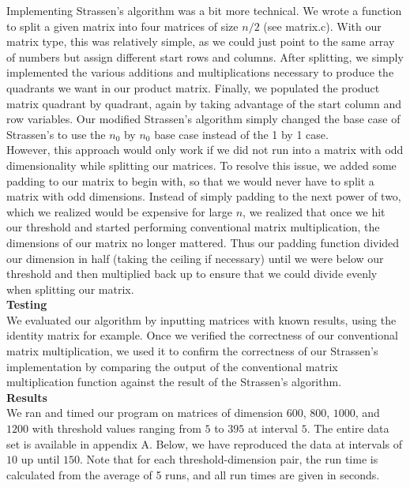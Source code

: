 \documentclass[12pt]{article}
\begin{document}
Implementing Strassen's algorithm was a bit more technical. We wrote a function to split a given matrix into four matrices of size $n/2$ (see matrix.c). With our matrix type, this was relatively simple, as we could just point to the same array of numbers but assign different start rows and columns. After splitting, we simply implemented the various additions and multiplications necessary to produce the quadrants we want in our product matrix. Finally, we populated the product matrix quadrant by quadrant, again by taking advantage of the start column and row variables. Our modified Strassen's algorithm simply changed the base case of Strassen's to use the $n_0$ by $n_0$ base case instead of the 1 by 1 case. \\

However, this approach would only work if we did not run into a matrix with odd dimensionality while splitting our matrices. To resolve this issue, we added some padding to our matrix to begin with, so that we would never have to split a matrix with odd dimensions. Instead of simply padding to the next power of two, which we realized would be expensive for large $n$, we realized that once we hit our threshold and started performing conventional matrix multiplication, the dimensions of our matrix no longer mattered. Thus our padding function divided our dimension in half (taking the ceiling if necessary) until we were below our threshold and then multiplied back up to ensure that we could divide evenly when splitting our matrix. \\

\textbf{Testing} \\
We evaluated our algorithm by inputting matrices with known results, using the identity matrix for example. Once we verified the correctness of our conventional matrix multiplication, we used it to confirm the correctness of our Strassen's implementation by comparing the output of the conventional matrix multiplication function against the result of the Strassen's algorithm. \\

\textbf{Results} \\
We ran and timed our program on matrices of dimension $600$, $800$, $1000$, and $1200$ with threshold values ranging from $5$ to $395$ at interval $5$. The entire data set is available in appendix A. Below, we have reproduced the data at intervals of $10$ up until $150$. Note that for each threshold-dimension pair, the run time is calculated from the average of 5 runs, and all run times are given in seconds.
\end{document}
